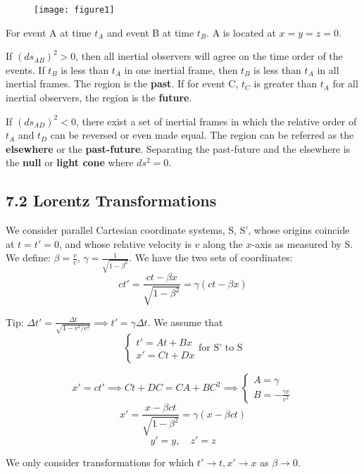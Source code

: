 \documentclass{article}
\begin{document}
	\begin{figure}[h]
		\centering
		\texttt{[image: figure1]}
		\caption{}
		\label{fig:figure1}
	\end{figure}
	
	For event A at time $t_A$ and event B at time $t_B$. A is located at $x=y=z=0$.
	
	If $(ds_{AB})^2 > 0$, then all inertial observers will agree on the time order of the events.
	If $t_B$ is less than $t_A$ in one inertial frame, then $t_B$ is less than $t_A$ in all inertial frames. The region is the \textbf{past}.
	If for event C, $t_C$ is greater than $t_A$ for all inertial observers, the region is the \textbf{future}.
	
	If $(ds_{AD})^2 < 0$, there exist a set of inertial frames in which the relative order of $t_A$ and $t_D$ can be reversed or even made equal. The region can be referred as the \textbf{elsewhere} or the \textbf{past-future}.
	Separating the past-future and the elsewhere is the \textbf{null} or \textbf{light cone} where $ds^2=0$.
	
	\subsection*{7.2 Lorentz Transformations}
	We consider parallel Cartesian coordinate systems, S, S', whose origins coincide at $t=t'=0$, and whose relative velocity is $v$ along the $x$-axis as measured by S.
	We define: $\beta = \frac{v}{c}$, $\gamma = \frac{1}{\sqrt{1-\beta^2}}$.
	We have the two sets of coordinates:
	\[ ct' = \frac{ct - \beta x}{\sqrt{1-\beta^2}} = \gamma(ct - \beta x) \]
	
	Tip: $\Delta t' = \frac{\Delta t}{\sqrt{1-v^2/c^2}} \implies t' = \gamma \Delta t$. We assume that
	\[
	\begin{cases}
		t' = At + Bx \\
		x' = Ct + Dx
	\end{cases}
	\text{for S' to S}
	\]
	
	\[ x' = ct' \implies Ct + DC = CA + BC^2 \implies
	\begin{cases}
		A = \gamma \\
		B = -\frac{\gamma v}{c^2}
	\end{cases}
	\]
	\[ x' = \frac{x-\beta c t}{\sqrt{1-\beta^2}} = \gamma(x-\beta c t) \]
	\[ y' = y, \quad z' = z \]
	
	We only consider transformations for which $t' \to t, x' \to x$ as $\beta \to 0$.
	
\end{document}
